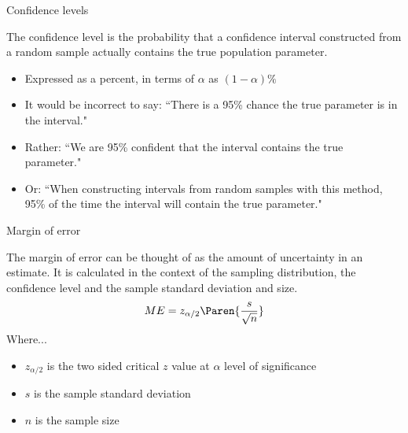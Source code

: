 \documentclass[xcolor=table]{beamer}
\begin{document}
\begin{frame}{Confidence levels}

\begin{block}{}
\large
The confidence level is the probability that a confidence interval constructed from a random sample actually contains the true population parameter.\\
\begin{itemize}
\pause\item Expressed as a percent, in terms of $\alpha$ as $(1-\alpha)\%$
\pause\item It would be incorrect to say: ``There is a 95\% chance the true parameter is in the interval."
\pause\item Rather: ``We are 95\% confident that the interval contains the true parameter."
\item Or: ``When constructing intervals from random samples with this method, 95\% of the time the interval will contain the true parameter."
\end{itemize} 
\end{block}

\end{frame}

\begin{frame}{Margin of error}
\begin{block}{}
\large
The margin of error can be thought of as the amount of uncertainty in an estimate. It is calculated in the context of the sampling distribution, the confidence level and the sample standard deviation and size.
\pause\[ME = z_{\alpha/2} \Paren{\frac s {\sqrt n}}\]
Where...
\begin{itemize}
\item $z_{\alpha/2}$ is the two sided critical $z$ value at $\alpha$ level of significance  
\item $s$ is the sample standard deviation
\item $n$ is the sample size
\end{itemize}
\end{block}
\end{frame}
\end{document}
